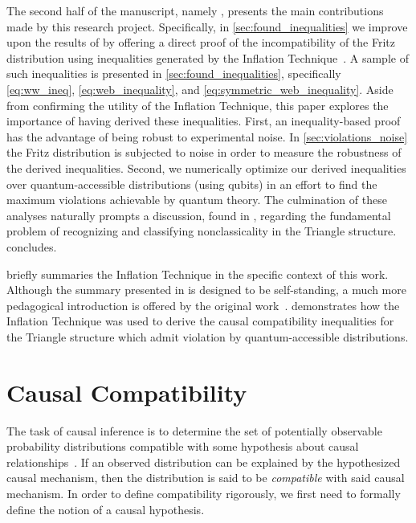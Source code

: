 \documentclass[aps, 10pt, english, twoside, pra, nofootinbib, tightenlines, longbibliography, superscriptaddress]{revtex4-1}
\begin{document}
    The second half of the manuscript, namely , presents the main contributions made by this research project. Specifically, in \cref{sec:found_inequalities} we improve upon the results of \citet{Fritz_2012} by offering a direct proof of the incompatibility of the Fritz distribution using inequalities generated by the Inflation Technique~\cite{Inflation}. A sample of such inequalities is presented in \cref{sec:found_inequalities}, specifically \cref{eq:ww_ineq}, \cref{eq:web_inequality}, and \cref{eq:symmetric_web_inequality}. Aside from confirming the utility of the Inflation Technique, this paper explores the importance of having derived these inequalities. First, an inequality-based proof has the advantage of being robust to experimental noise. In \cref{sec:violations_noise} the Fritz distribution is subjected to noise in order to measure the robustness of the derived inequalities. Second, we numerically optimize our derived inequalities over quantum-accessible distributions (using qubits) in an effort to find the maximum violations achievable by quantum theory. The culmination of these analyses naturally prompts a discussion, found in , regarding the fundamental problem of recognizing and classifying nonclassicality in the Triangle structure.  concludes.

     briefly summaries the Inflation Technique in the specific context of this work. Although the summary presented in  is designed to be self-standing, a much more pedagogical introduction is offered by the original work~\cite{Inflation}.  demonstrates how the Inflation Technique was used to derive the causal compatibility inequalities for the Triangle structure which admit violation by quantum-accessible distributions.

    \section{Causal Compatibility}
    \label{sec:causal_compatibility}
    The task of causal inference is to determine the set of potentially observable probability distributions compatible with some hypothesis about causal relationships~\cite{Pearl_2009}. If an observed distribution can be explained by the hypothesized causal mechanism, then the distribution is said to be \textit{compatible} with said causal mechanism. In order to define compatibility rigorously, we first need to formally define the notion of a causal hypothesis.
\end{document}
